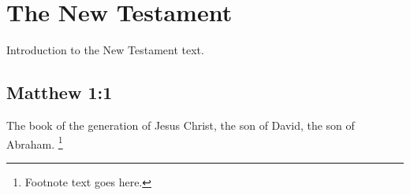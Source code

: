 \documentclass{article}%
\begin{document}
%
\normalsize%
\section{The New Testament}%
\label{sec:TheNewTestament}%
Introduction to the New Testament text.%
\subsection{Matthew 1:1}%
\label{subsec:Matthew11}%
The book of the generation of Jesus Christ, the son of David, the son of Abraham.%
\footnote{Footnote text goes here.}

%
\end{document}
